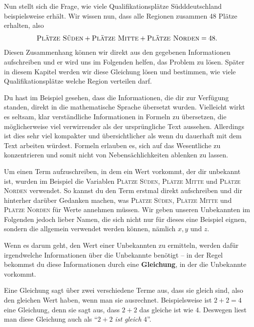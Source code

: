 \documentclass[../../main.tex]{subfiles}
\begin{document}
\begin{example}{}
    Nun stellt sich die Frage, wie viele Qualifikationsplätze Südddeutschland beispielsweise erhält. Wir wissen nun, dass alle Regionen zusammen 48 Plätze erhalten, also
    \[\textsc{Plätze Süden}+\textsc{Plätze Mitte}+\textsc{Plätze Norden}=48.\]
    Diesen Zusammenhang können wir direkt aus den gegebenen Informationen aufschreiben und er wird uns im Folgenden helfen, das Problem zu lösen. Später in diesem Kapitel werden wir diese Gleichung lösen und bestimmen, wie viele Qualifikationsplätze welche Region verteilen darf.
\end{example}

Du hast im Beispiel gesehen, dass die Informationen, die dir zur Verfügung standen, direkt in die mathematische Sprache übersetzt wurden. Vielleicht wirkt es seltsam, klar verständliche Informationen in Formeln zu übersetzen, die möglicherweise viel verwirrender als der ursprüngliche Text aussehen. Allerdings ist dies sehr viel kompakter und übersichtlicher als wenn du dauerhaft mit dem Text arbeiten würdest. Formeln erlauben es, sich auf das Wesentliche zu konzentrieren und somit nicht von Nebensächlichkeiten ablenken zu lassen.

Um einen Term aufzuschreiben, in dem ein Wert vorkommt, der dir unbekannt ist, wurden im Beispiel die Variablen \textsc{Plätze Süden}, \textsc{Plätze Mitte} und \textsc{Plätze Norden} verwendet. So kannst du den Term erstmal direkt aufschreiben und dir hinterher darüber Gedanken machen, was \textsc{Plätze Süden}, \textsc{Plätze Mitte} und \textsc{Plätze Norden} für Werte annehmen müssen. Wir geben unseren Unbekannten im Folgenden jedoch lieber Namen, die sich nicht nur für dieses eine Beispiel eignen, sondern die allgemein verwendet werden können, nämlich $x, y$ und $z$.

Wenn es darum geht, den Wert einer Unbekannten zu ermitteln, werden dafür irgendwelche Informationen über die Unbekannte benötigt -- in der Regel bekommst du diese Informationen durch eine \textbf{Gleichung}, in der die Unbekannte vorkommt.

Eine Gleichung sagt über zwei verschiedene Terme aus, dass sie gleich sind, also den gleichen Wert haben, wenn man sie ausrechnet. Beispielsweise ist $2+2=4$ eine Gleichung, denn sie sagt aus, dass $2+2$ das gleiche ist wie $4$. Deswegen liest man diese Gleichung auch als \enquote{$2+2$ \emph{ist gleich} $4$}.
\end{document}
